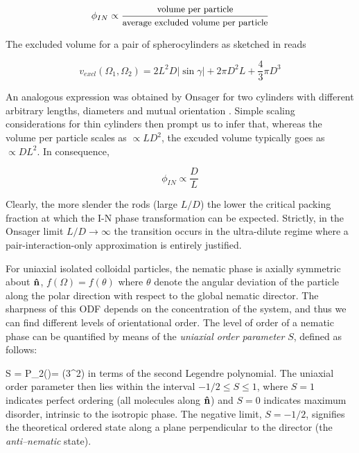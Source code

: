 \begin{equation}
\phi_{IN} \propto \frac{\mbox{{\small volume per particle}}}{\mbox{{\small average excluded volume per particle}}}
\end{equation}

The excluded volume for a pair of spherocylinders as sketched in  reads

\begin{equation}
v_{excl}(\Omega_1,\Omega_2) = 2L^2D |\sin\gamma|+2\pi D^2 L + \frac{4}{3}\pi D^3
\end{equation}

An analogous expression was obtained by Onsager for two cylinders with different arbitrary lengths, diameters and mutual orientation \cite{onsager1949}. Simple scaling considerations for thin cylinders then prompt us to infer that, whereas the volume per particle scales as $\propto L D^2$, the excuded volume typically goes as $\propto D L^2$. In consequence,


\begin{equation}
\phi_{IN} \propto \frac{D}{L}
\end{equation}

Clearly, the more slender the rods (large $L/D$) the lower the critical packing fraction at which the I-N phase transformation can be expected. Strictly, in the Onsager limit $L/D \rightarrow \infty$ the transition occurs in the ultra-dilute regime where a pair-interaction-only approximation is entirely justified.

For uniaxial isolated colloidal particles, the nematic phase is axially symmetric about ${\bf \hat{n}}$, $f(\Omega)=f(\theta)$ where $\theta$ denote the angular deviation of the particle along the polar direction with respect to the global nematic director. The sharpness of this ODF depends on the concentration of the system, and thus we can find different levels of orientational order. The level of order of a nematic phase can be quantified by means of the {\em uniaxial order parameter} $S$, defined as follows:

\beq
S = \langle P_2(\cos\theta)\rangle =  (3\langle\cos^2\theta{})
\label{nemdirector}
\eeq
in terms of the second Legendre polynomial. The uniaxial order parameter then lies within the interval $-1/2 \leq S \leq 1$, where $S=1$ indicates perfect ordering (all molecules along ${\bf \hat{n}}$) and $S=0$ indicates maximum disorder, intrinsic to the isotropic phase. The negative limit, $S=-1/2$, signifies the theoretical ordered state along a plane perpendicular to the director (the {\em anti--nematic} state).


